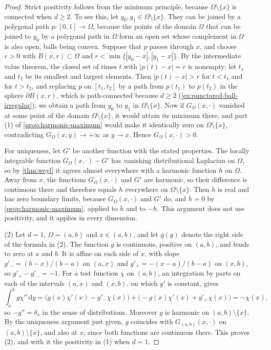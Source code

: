 \begin{proof}
Strict positivity follows from the minimum principle, because $\Omega\setminus\{x\}$ is connected when $d\geq2$. To see this, let $y_0,y_1\in\Omega\setminus\{x\}$. They can be joined by a polygonal path $p\colon[0,1]\to\Omega$, because the points of the domain $\Omega$ that can be joined to $y_0$ by a polygonal path in $\Omega$ form an open set whose complement in $\Omega$ is also open, balls being convex. Suppose that $p$ passes through $x$, and choose $r>0$ with $\overline{B(x,r)}\subset\Omega$ and $r<\min\{|y_0-x|,|y_1-x|\}$. By the intermediate value theorem, the closed set of times $t$ with $|p(t)-x|=r$ is nonempty; let $t_1$ and $t_2$ be its smallest and largest elements. Then $|p(t)-x|>r$ for $t<t_1$ and for $t>t_2$, and replacing $p$ on $[t_1,t_2]$ by a path from $p(t_1)$ to $p(t_2)$ in the sphere $\partial B(x,r)$, which is path-connected because $d\geq2$ (\cref{ex:punctured-ball-irregular}), we obtain a path from $y_0$ to $y_1$ in $\Omega\setminus\{x\}$. Now if $G_\Omega(x,\cdot)$ vanished at some point of the domain $\Omega\setminus\{x\}$, it would attain its minimum there, and part (1) of \cref{prop:harmonic-maximum} would make it identically zero on $\Omega\setminus\{x\}$, contradicting $G_\Omega(x,y)\to+\infty$ as $y\to x$. Hence $G_\Omega(x,\cdot)>0$.

For uniqueness, let $G'$ be another function with the stated properties. The locally integrable function $G_\Omega(x,\cdot)-G'$ has vanishing distributional Laplacian on $\Omega$, so by \cref{thm:weyl} it agrees almost everywhere with a harmonic function $h$ on $\Omega$. Away from $x$, the functions $G_\Omega(x,\cdot)$ and $G'$ are harmonic, so their difference is continuous there and therefore equals $h$ everywhere on $\Omega\setminus\{x\}$. Then $h$ is real and has zero boundary limits, because $G_\Omega(x,\cdot)$ and $G'$ do, and $h=0$ by \cref{prop:harmonic-maximum}, applied to $h$ and to $-h$. This argument does not use positivity, and it applies in every dimension.

(2) Let $d=1$, $\Omega=(a,b)$ and $x\in(a,b)$, and let $g(y)$ denote the right side of the formula in (2). The function $g$ is continuous, positive on $(a,b)$, and tends to zero at $a$ and $b$. It is affine on each side of $x$, with slope $g'_-=(b-x)/(b-a)$ on $(a,x)$ and $g'_+=-(x-a)/(b-a)$ on $(x,b)$, so $g'_+-g'_-=-1$. For a test function $\chi$ on $(a,b)$, an integration by parts on each of the intervals $(a,x)$ and $(x,b)$, on which $g'$ is constant, gives
\[
 \int_a^bg\chi''\,\mathrm dy=\bigl(g(x)\chi'(x)-g'_-\chi(x)\bigr)+\bigl(-g(x)\chi'(x)+g'_+\chi(x)\bigr)=-\chi(x),
\]
so $-g''=\delta_x$ in the sense of distributions. Moreover $g$ is harmonic on $(a,b)\setminus\{x\}$. By the uniqueness argument just given, $g$ coincides with $G_{(a,b)}(x,\cdot)$ on $(a,b)\setminus\{x\}$, and also at $x$, since both functions are continuous there. This proves (2), and with it the positivity in (1) when $d=1$.


\end{proof}
